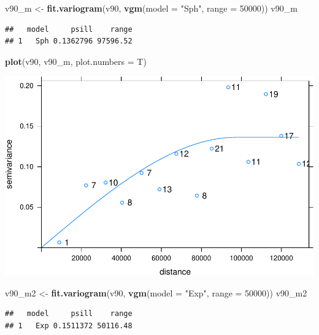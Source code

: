 \documentclass[11pt,]{article}
\newenvironment{Shaded}{\begin{snugshade}}{\end{snugshade}}
\newcommand{\KeywordTok}[1]{\textcolor[rgb]{0.13,0.29,0.53}{\textbf{#1}}}
\newcommand{\DataTypeTok}[1]{\textcolor[rgb]{0.13,0.29,0.53}{#1}}
\newcommand{\DecValTok}[1]{\textcolor[rgb]{0.00,0.00,0.81}{#1}}
\newcommand{\StringTok}[1]{\textcolor[rgb]{0.31,0.60,0.02}{#1}}
\newcommand{\NormalTok}[1]{#1}
\begin{document}
\begin{Shaded}
\begin{Highlighting}[]
\NormalTok{v90_m <-}\StringTok{ }\KeywordTok{fit.variogram}\NormalTok{(v90, }\KeywordTok{vgm}\NormalTok{(}\DataTypeTok{model =} \StringTok{"Sph"}\NormalTok{, }\DataTypeTok{range =} \DecValTok{50000}\NormalTok{))}
\NormalTok{v90_m}
\end{Highlighting}
\end{Shaded}

\begin{verbatim}
##   model     psill    range
## 1   Sph 0.1362796 97596.52
\end{verbatim}

\begin{Shaded}
\begin{Highlighting}[]
\KeywordTok{plot}\NormalTok{(v90, v90_m, }\DataTypeTok{plot.numbers =}\NormalTok{ T)}
\end{Highlighting}
\end{Shaded}

\includegraphics[width=800px]{Proyecto-Precipitaciones_files/figure-latex/vgm-pre1990-ajus-exp-1}

\begin{Shaded}
\begin{Highlighting}[]
\NormalTok{v90_m2 <-}\StringTok{ }\KeywordTok{fit.variogram}\NormalTok{(v90, }\KeywordTok{vgm}\NormalTok{(}\DataTypeTok{model =} \StringTok{"Exp"}\NormalTok{, }\DataTypeTok{range =} \DecValTok{50000}\NormalTok{))}
\NormalTok{v90_m2}
\end{Highlighting}
\end{Shaded}

\begin{verbatim}
##   model     psill    range
## 1   Exp 0.1511372 50116.48
\end{verbatim}
\end{document}
